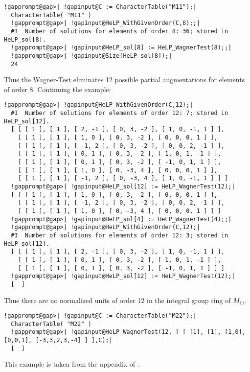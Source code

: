 \documentclass[a4paper,11pt]{report}
\begin{document}
{{ 
\begin{Verbatim}[commandchars=!@|,fontsize=\small,frame=single,label=Example]
  !gapprompt@gap>| !gapinput@C := CharacterTable("M11");|
  CharacterTable( "M11" )
  !gapprompt@gap>| !gapinput@HeLP_WithGivenOrder(C,8);;|
  #I  Number of solutions for elements of order 8: 36; stored in HeLP_sol[8].
  !gapprompt@gap>| !gapinput@HeLP_sol[8] := HeLP_WagnerTest(8);;|
  !gapprompt@gap>| !gapinput@Size(HeLP_sol[8]);|
  24
\end{Verbatim}
 Thus the Wagner-Test eliminates 12 possible partial augmentations for elements
of order 8. Continuing the example: 
\begin{Verbatim}[commandchars=!@|,fontsize=\small,frame=single,label=Example]
  !gapprompt@gap>| !gapinput@HeLP_WithGivenOrder(C,12);|
  #I  Number of solutions for elements of order 12: 7; stored in HeLP_sol[12].
  [ [ [ 1 ], [ 1 ], [ 2, -1 ], [ 0, 3, -2 ], [ 1, 0, -1, 1 ] ], 
    [ [ 1 ], [ 1 ], [ 1, 0 ], [ 0, 3, -2 ], [ 0, 0, 0, 1 ] ], 
    [ [ 1 ], [ 1 ], [ -1, 2 ], [ 0, 3, -2 ], [ 0, 0, 2, -1 ] ], 
    [ [ 1 ], [ 1 ], [ 0, 1 ], [ 0, 3, -2 ], [ 1, 0, 1, -1 ] ], 
    [ [ 1 ], [ 1 ], [ 0, 1 ], [ 0, 3, -2 ], [ -1, 0, 1, 1 ] ], 
    [ [ 1 ], [ 1 ], [ 1, 0 ], [ 0, -3, 4 ], [ 0, 0, 0, 1 ] ], 
    [ [ 1 ], [ 1 ], [ -1, 2 ], [ 0, -3, 4 ], [ 1, 0, -1, 1 ] ] ]
  !gapprompt@gap>| !gapinput@HeLP_sol[12] := HeLP_WagnerTest(12);|
  [ [ [ 1 ], [ 1 ], [ 1, 0 ], [ 0, 3, -2 ], [ 0, 0, 0, 1 ] ], 
    [ [ 1 ], [ 1 ], [ -1, 2 ], [ 0, 3, -2 ], [ 0, 0, 2, -1 ] ], 
    [ [ 1 ], [ 1 ], [ 1, 0 ], [ 0, -3, 4 ], [ 0, 0, 0, 1 ] ] ]
  !gapprompt@gap>| !gapinput@HeLP_sol[4] := HeLP_WagnerTest(4);;|
  !gapprompt@gap>| !gapinput@HeLP_WithGivenOrder(C,12);|
  #I  Number of solutions for elements of order 12: 3; stored in HeLP_sol[12].
  [ [ [ 1 ], [ 1 ], [ 2, -1 ], [ 0, 3, -2 ], [ 1, 0, -1, 1 ] ], 
    [ [ 1 ], [ 1 ], [ 0, 1 ], [ 0, 3, -2 ], [ 1, 0, 1, -1 ] ], 
    [ [ 1 ], [ 1 ], [ 0, 1 ], [ 0, 3, -2 ], [ -1, 0, 1, 1 ] ] ]
  !gapprompt@gap>| !gapinput@HeLP_sol[12] := HeLP_WagnerTest(12);|
  [  ]
\end{Verbatim}
 Thus there are no normalized units of order 12 in the integral group ring of $M_{11}.$ 
\begin{Verbatim}[commandchars=!@|,fontsize=\small,frame=single,label=Example]
  !gapprompt@gap>| !gapinput@C := CharacterTable("M22");|
  CharacterTable( "M22" )
  !gapprompt@gap>| !gapinput@HeLP_WagnerTest(12, [ [ [1], [1], [1,0], [0,0,1], [-3,3,2,3,-4] ] ],C);|
  [  ]
\end{Verbatim}
 This example is taken from the appendix of \cite{KonovalovM22}.

}}
\end{document}
